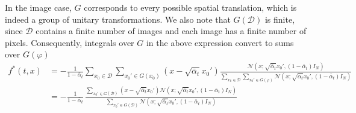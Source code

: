 \documentclass[a4paper,10pt]{article}
\begin{document}
In the image case, $G$ corresponds to every possible spatial translation, which is indeed a group of unitary transformations. We also note that $G(\mathcal{D})$ is finite, since $\mathcal{D}$ contains a finite number of images and each image has a finite number of pixels. Consequently, integrals over $G$ in the above expression convert to sums over $G(\varphi)$ 
\begin{align*}
        f^*(t,x) &= -\frac{1}{1-\bar \alpha_t} \sum\limits_{x_0  \in \mathcal{D}} \sum\limits_{x_0' \in G(x_0)} (x - \sqrt{\bar \alpha_t} x_0') \frac{\mathcal{N}(x;\sqrt{\bar \alpha_t} x_0', (1-\bar \alpha_t) I_N) }{\sum\limits_{x_0  \in \mathcal{D}} \sum\limits_{x_0'\in G(\varphi)} \mathcal{N}(x;\sqrt{\bar \alpha_t} x_0', (1-\bar \alpha_t) I_N)}\\
        &= -\frac{1}{1-\bar \alpha_t}  \,\frac{\sum\limits_{x_0' \in G(\mathcal{D})} (x - \sqrt{\bar \alpha_t} x_0') \mathcal{N}(x;\sqrt{\bar \alpha_t} x_0', (1-\bar \alpha_t) I_N) }{ \sum\limits_{x_0'\in G(\mathcal{D})} \mathcal{N}(x;\sqrt{\bar \alpha_t} x_0', (1-\bar \alpha_t) I_N)}
\end{align*}

\end{document}
